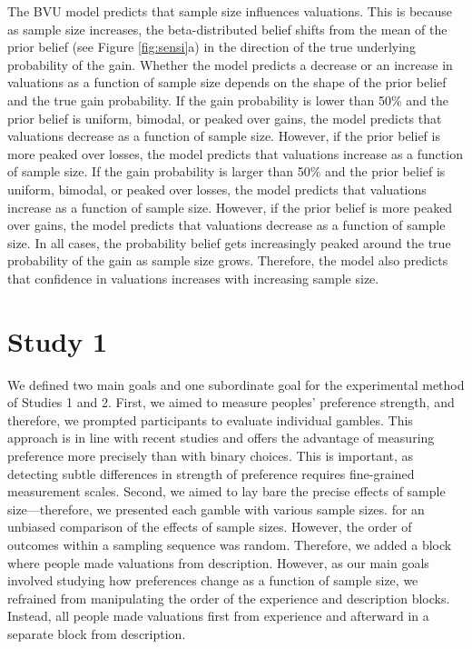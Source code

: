 \documentclass[a4paper, man, natbib, floatsintext]{apa6} %
\begin{document}
The BVU model predicts that sample size influences valuations. This is because as sample size increases, the beta-distributed belief shifts from the mean of the prior belief (see Figure \ref{fig:sensi}a) in the direction of the true underlying probability of the gain. Whether the model predicts a decrease or an increase in valuations as a function of sample size depends on the shape of the prior belief and the true gain probability. If the gain probability is lower than 50\% and the prior belief is uniform, bimodal, or peaked over gains, the model predicts that valuations decrease as a function of sample size. However, if the prior belief is more peaked over losses, the model predicts that valuations increase as a function of sample size. If the gain probability is larger than 50\% and the prior belief is uniform, bimodal, or peaked over losses, the model predicts that valuations increase as a function of sample size. However, if the prior belief is more peaked over gains, the model predicts that valuations decrease as a function of sample size. In all cases, the probability belief gets increasingly peaked around the true probability of the gain as sample size grows. Therefore, the model also predicts that confidence in valuations increases with increasing sample size. %

\section{Study 1}
We defined two main goals and one subordinate goal for the experimental method of Studies 1 and 2. First, we aimed to measure peoples' preference strength, and therefore, we prompted participants to evaluate individual gambles. This approach is in line with recent studies \citep[e.g.,][]{Ashby2014, Golan2014, Pachur2012} and offers the advantage of measuring preference more precisely than with binary choices. This is important, as detecting subtle differences in strength of preference requires fine-grained measurement scales. Second, we aimed to lay bare the precise effects of sample size---therefore, we presented each gamble with various sample sizes.  for an unbiased comparison of the effects of sample sizes. However, the order of outcomes within a sampling sequence was random.  Therefore, we added a block where people made valuations from description. However, as our main goals involved studying how preferences change as a function of sample size, we refrained from manipulating the order of the experience and description blocks. Instead, all people made valuations first from experience and afterward in a separate block from description. 
\end{document}
